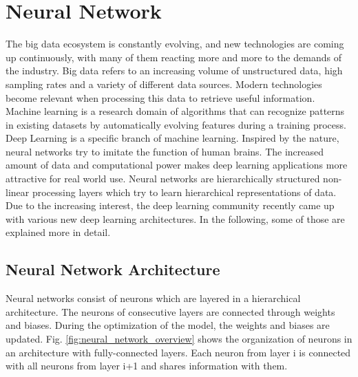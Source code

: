 \section{Neural Network}
The big data ecosystem is constantly evolving, and new technologies are coming up continuously, with many of them reacting more and more to the demands of the industry. Big data refers to an increasing volume of unstructured data, high sampling rates and a variety of different data sources. Modern technologies become relevant when processing this data to retrieve useful information. Machine learning is a research domain of algorithms that can recognize patterns in existing datasets by automatically evolving features during a training process. Deep Learning is a specific branch of machine learning. Inspired by the nature, neural networks try to imitate the function of human brains. The increased amount of data and computational power makes deep learning applications more attractive for real world use. Neural networks are hierarchically structured non-linear processing layers which try to learn hierarchical representations of data. Due to the increasing interest, the deep learning community recently came up with various new deep learning architectures. In the following, some of those are explained more in detail.

\subsection{Neural Network Architecture}
Neural networks consist of neurons which are layered in a hierarchical architecture. The neurons of consecutive layers are connected through weights and biases. During the optimization of the model, the weights and biases are updated. Fig. \ref{fig:neural_network_overview} shows the organization of neurons in an architecture with fully-connected layers. Each neuron from layer i is connected with all neurons from layer i+1 and shares information with them.

